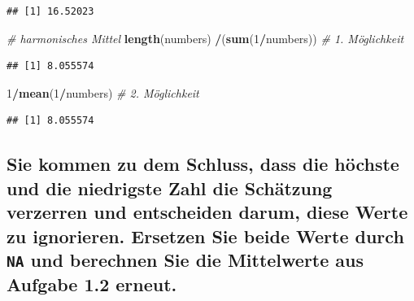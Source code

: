 \documentclass[12pt,a4paper]{article}
\newenvironment{Shaded}{\begin{snugshade}}{\end{snugshade}}
\newcommand{\CommentTok}[1]{\textcolor[rgb]{0.56,0.35,0.01}{\textit{#1}}}
\newcommand{\DecValTok}[1]{\textcolor[rgb]{0.00,0.00,0.81}{#1}}
\newcommand{\FunctionTok}[1]{\textcolor[rgb]{0.13,0.29,0.53}{\textbf{#1}}}
\newcommand{\NormalTok}[1]{#1}
\newcommand{\SpecialCharTok}[1]{\textcolor[rgb]{0.81,0.36,0.00}{\textbf{#1}}}
\begin{document}
\begin{verbatim}
## [1] 16.52023
\end{verbatim}

\begin{Shaded}
\begin{Highlighting}[]
    \CommentTok{\# harmonisches Mittel}
    \FunctionTok{length}\NormalTok{(numbers) }\SpecialCharTok{/}\NormalTok{(}\FunctionTok{sum}\NormalTok{(}\DecValTok{1}\SpecialCharTok{/}\NormalTok{numbers))       }\CommentTok{\# 1. Möglichkeit}
\end{Highlighting}
\end{Shaded}

\begin{verbatim}
## [1] 8.055574
\end{verbatim}

\begin{Shaded}
\begin{Highlighting}[]
    \DecValTok{1}\SpecialCharTok{/}\FunctionTok{mean}\NormalTok{(}\DecValTok{1}\SpecialCharTok{/}\NormalTok{numbers)                       }\CommentTok{\# 2. Möglichkeit}
\end{Highlighting}
\end{Shaded}

\begin{verbatim}
## [1] 8.055574
\end{verbatim}

\vspace{0.5cm}

\hypertarget{sie-kommen-zu-dem-schluss-dass-die-huxf6chste-und-die-niedrigste-zahl-die-schuxe4tzung-verzerren-und-entscheiden-darum-diese-werte-zu-ignorieren.-ersetzen-sie-beide-werte-durch-und-berechnen-sie-die-mittelwerte-aus-aufgabe-1.2-erneut.}{%
\subsection{\texorpdfstring{Sie kommen zu dem Schluss, dass die höchste
und die niedrigste Zahl die Schätzung verzerren und entscheiden darum,
diese Werte zu ignorieren. Ersetzen Sie beide Werte durch \texttt{NA}
und berechnen Sie die Mittelwerte aus Aufgabe 1.2
erneut.}{Sie kommen zu dem Schluss, dass die höchste und die niedrigste Zahl die Schätzung verzerren und entscheiden darum, diese Werte zu ignorieren. Ersetzen Sie beide Werte durch  und berechnen Sie die Mittelwerte aus Aufgabe 1.2 erneut.}}\label{sie-kommen-zu-dem-schluss-dass-die-huxf6chste-und-die-niedrigste-zahl-die-schuxe4tzung-verzerren-und-entscheiden-darum-diese-werte-zu-ignorieren.-ersetzen-sie-beide-werte-durch-und-berechnen-sie-die-mittelwerte-aus-aufgabe-1.2-erneut.}}
\end{document}
